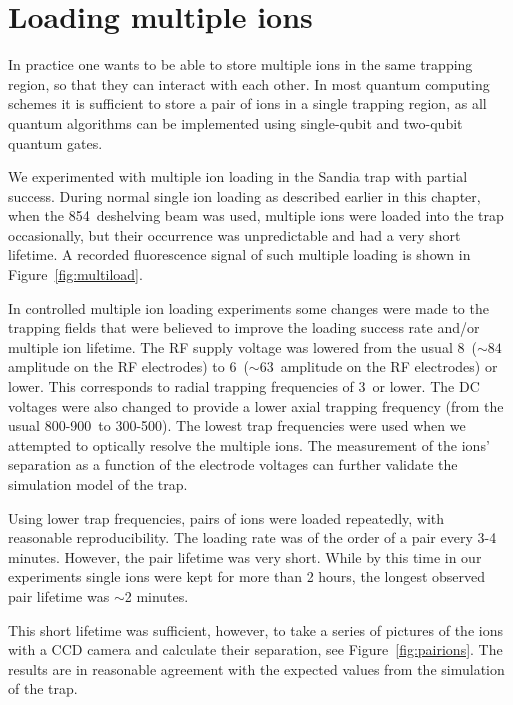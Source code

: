 \section{Loading multiple ions}
\label{sec:multiions}

In practice one wants to be able to store multiple ions in the same trapping region, so that they can interact with each other. In most quantum computing schemes it is sufficient to store a pair of ions in a single trapping region, as all quantum algorithms can be implemented using single-qubit and two-qubit quantum gates. 

We experimented with multiple ion loading in the Sandia trap with partial success. During normal single ion loading as described earlier in this chapter, when the 854\nm\, deshelving beam was used, multiple ions were loaded into the trap occasionally, but their occurrence was unpredictable and had a very short lifetime. A recorded fluorescence signal of such multiple loading is shown in Figure~\ref{fig:multiload}.

In controlled multiple ion loading experiments some changes were made to the trapping fields that were believed to improve the loading success rate and/or multiple ion lifetime. The RF supply voltage was lowered from the usual 8\Vpp\, ($\sim 84$\V\, amplitude on the RF electrodes) to 6\Vpp\, ($\sim 63$\V\, amplitude on the RF electrodes) or lower. This corresponds to radial trapping frequencies of 3\MHz\, or lower. The DC voltages were also changed to provide a lower axial trapping frequency (from the usual 800-900\kHz\, to 300-500\kHz). The lowest trap frequencies were used when we attempted to optically resolve the multiple ions. The measurement of the ions' separation as a function of the electrode voltages can further validate the simulation model of the trap.

Using lower trap frequencies, pairs of ions were loaded repeatedly, with reasonable reproducibility. The loading rate was of the order of a pair every 3-4 minutes. However, the pair lifetime was very short. While by this time in our experiments single ions were kept for more than 2 hours, the longest observed pair lifetime was $\sim$2 minutes. 

This short lifetime was sufficient, however, to take a series of pictures of the ions with a CCD camera and calculate their separation, see Figure~\ref{fig:pairions}. The results are in reasonable agreement with the expected values from the simulation of the trap. 





